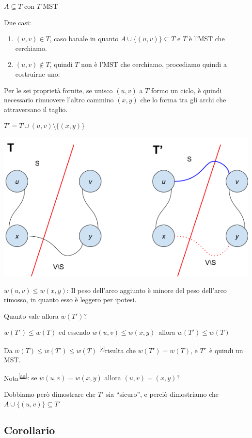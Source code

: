 \documentclass{article}
\providecommand{\tightlist}{%
  \setlength{\itemsep}{0pt}\setlength{\parskip}{0pt}}
\begin{document}
{{{$A \subseteq T$ con $T$ MST}

{Due casi:}

\begin{enumerate}
\tightlist
\item
  {$(u,v) \in T$, caso banale in quanto $A \cup \{(u,v)\} \subseteq T$  e $T$ è l'MST che cerchiamo.}
\item
  {$(u,v) \notin T$, quindi $T$ non è l'MST che cerchiamo, procediamo quindi a costruirne uno:}
\end{enumerate}

{Per le sei proprietà fornite, se unisco $(u,v)$ a $T$ formo un ciclo, è quindi necessario rimuovere l'altro cammino $(x,y)$ che lo forma tra gli archi che attraversano il taglio. }

$T' = T \cup {(u,v)} \setminus \{(x,y)\} $

{\includegraphics{images/image530.png}}

$w(u,v) \leq w(x,y)${: Il peso dell'arco aggiunto è minore del peso dell'arco rimosso, in quanto esso è leggero per ipotesi.}

{Quanto vale allora $w(T')$? }

$w(T') \leq w(T)$ {ed essendo }$w(u,v) \leq w(x,y)${~allora $w(T') \leq w(T)$}

{Da }$w(T) \leq w(T') \leq w(T)$ \textsuperscript{\protect\hyperlink{cmnt26}{{[}z{]}}}{risulta che $w(T') = w(T)$, e }$T'${~è quindi un MST.}

{Nota}\textsuperscript{\protect\hyperlink{cmnt27}{{[}aa{]}}}{: se $w(u,v) = w(x,y)$ allora $(u,v) = (x,y)$?}

{Dobbiamo però dimostrare che $T'$ sia ``sicuro'', e perciò dimostriamo che \\ $A \cup \{(u,v)\} \subseteq T'$}

\subsection{Corollario}

}}
\end{document}
